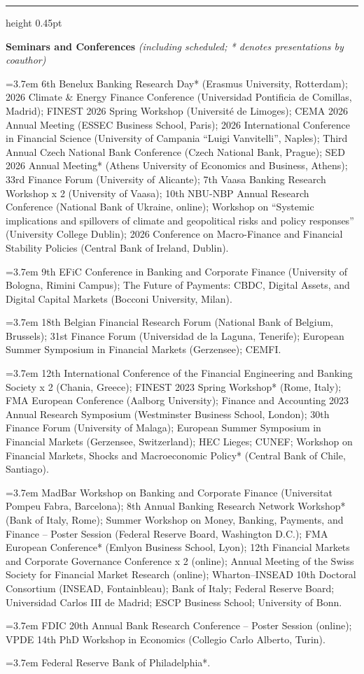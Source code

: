 \documentclass[11pt,a4paper]{article}
\newcommand{\cvsection}[1]{%
  \Needspace{4.2\baselineskip}%
  \par\vspace{1.00em}%
  {\sffamily\mdseries\fontsize{10.9pt}{12.4pt}\selectfont\color{Ink}\textls[65]{\MakeUppercase{#1}}\par}%
  \vspace{0.18em}%
  {\color{RuleColor}\hrule height 0.45pt}%
  \vspace{0.43em}%
}
\newcommand{\yearentry}[2]{%
  \par\noindent
  \hangindent=3.7em\hangafter=1%
  \makebox[3.7em][l]{\sffamily\mdseries\color{AcademicBlue}#1:}#2\par
  \vspace{0.30em}%
}
\begin{document}
\cvsection{Presentations}
{\bfseries\color{AcademicBlue} Seminars and Conferences} \textit{(including scheduled; * denotes presentations by coauthor)}
\par\vspace{0.28em}
\yearentry{2026}{6th Benelux Banking Research Day* (Erasmus University, Rotterdam); 2026 Climate \& Energy Finance Conference (Universidad Pontificia de Comillas, Madrid); FINEST 2026 Spring Workshop (Universit\'e de Limoges); CEMA 2026 Annual Meeting (ESSEC Business School, Paris); 2026 International Conference in Financial Science (University of Campania ``Luigi Vanvitelli'', Naples); Third Annual Czech National Bank Conference (Czech National Bank, Prague); SED 2026 Annual Meeting* (Athens University of Economics and Business, Athens); 33rd Finance Forum (University of Alicante); 7th Vaasa Banking Research Workshop x 2 (University of Vaasa); 10th NBU-NBP Annual Research Conference (National Bank of Ukraine, online); Workshop on ``Systemic implications and spillovers of climate and geopolitical risks and policy responses'' (University College Dublin); 2026 Conference on Macro-Finance and Financial Stability Policies (Central Bank of Ireland, Dublin).}
\yearentry{2025}{9th EFiC Conference in Banking and Corporate Finance (University of Bologna, Rimini Campus); The Future of Payments: CBDC, Digital Assets, and Digital Capital Markets (Bocconi University, Milan).}
\yearentry{2024}{18th Belgian Financial Research Forum (National Bank of Belgium, Brussels); 31st Finance Forum (Universidad de la Laguna, Tenerife); European Summer Symposium in Financial Markets (Gerzensee); CEMFI.}
\yearentry{2023}{12th International Conference of the Financial Engineering and Banking Society x 2 (Chania, Greece); FINEST 2023 Spring Workshop* (Rome, Italy); FMA European Conference (Aalborg University); Finance and Accounting 2023 Annual Research Symposium (Westminster Business School, London); 30th Finance Forum (University of Malaga); European Summer Symposium in Financial Markets (Gerzensee, Switzerland); HEC Lieges; CUNEF; Workshop on Financial Markets, Shocks and Macroeconomic Policy* (Central Bank of Chile, Santiago).}
\yearentry{2022}{MadBar Workshop on Banking and Corporate Finance (Universitat Pompeu Fabra, Barcelona); 8th Annual Banking Research Network Workshop* (Bank of Italy, Rome); Summer Workshop on Money, Banking, Payments, and Finance -- Poster Session (Federal Reserve Board, Washington D.C.); FMA European Conference* (Emlyon Business School, Lyon); 12th Financial Markets and Corporate Governance Conference x 2 (online); Annual Meeting of the Swiss Society for Financial Market Research (online); Wharton--INSEAD 10th Doctoral Consortium (INSEAD, Fontainbleau); Bank of Italy; Federal Reserve Board; Universidad Carlos III de Madrid; ESCP Business School; University of Bonn.}
\yearentry{2021}{FDIC 20th Annual Bank Research Conference -- Poster Session (online); VPDE 14th PhD Workshop in Economics (Collegio Carlo Alberto, Turin).}
\yearentry{2019}{Federal Reserve Bank of Philadelphia*.}
\end{document}
